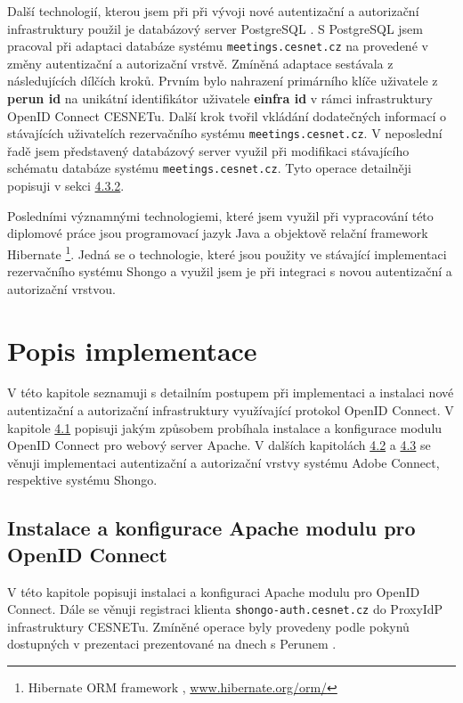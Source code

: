 \documentclass[
  printed, %
  twoside, %
  table,   %
  nolof,     %
  nolot,     %
]{fithesis3}
\begin{document}
\par

Další technologií, kterou jsem při při vývoji nové autentizační a autorizační infrastruktury použil je databázový server PostgreSQL \cite{postgresql}. S PostgreSQL jsem pracoval při adaptaci databáze systému \texttt{meetings.cesnet.cz} na provedené v změny autentizační a autorizační vrstvě. Zmíněná adaptace sestávala z následujících dílčích kroků. Prvním bylo nahrazení primárního klíče uživatele z \textbf{perun id} na unikátní identifikátor uživatele  \textbf{einfra id} v rámci infrastruktury OpenID Connect CESNETu. Další krok tvořil vkládání dodatečných informací o stávajících uživatelích rezervačního systému \texttt{meetings.cesnet.cz}. V neposlední řadě jsem představený databázový server využil při modifikaci stávajícího schématu databáze systému \texttt{meetings.cesnet.cz}. Tyto operace detailněji popisuji v sekci \hyperref[ShongoImpl-web]{4.3.2}. 
\par 
Posledními významnými technologiemi, které jsem využil při vypracování této diplomové práce jsou programovací jazyk Java a objektově relační framework Hibernate \footnote{Hibernate ORM framework , \url{www.hibernate.org/orm/}}. Jedná se o technologie, které jsou použity ve stávající implementaci rezervačního systému Shongo a využil jsem je při integraci s novou autentizační a autorizační vrstvou.  


\chapter{Popis implementace}
V této kapitole seznamuji s detailním postupem při implementaci a instalaci nové autentizační a autorizační infrastruktury využívající protokol OpenID Connect. V kapitole \hyperref[apacheConfig]{4.1} popisuji jakým způsobem probíhala instalace a konfigurace modulu OpenID Connect pro webový server Apache. V dalších kapitolách \hyperref[ACImpl]{4.2} a \hyperref[ShongoImpl]{4.3} se věnuji implementaci autentizační a autorizační vrstvy systému Adobe Connect, respektive systému Shongo.   


\section{Instalace a konfigurace Apache modulu pro OpenID Connect}
\label{apacheInstall}
V této kapitole popisuji instalaci a konfiguraci Apache modulu pro OpenID Connect. Dále se věnuji registraci klienta \texttt{shongo-auth.cesnet.cz} do ProxyIdP infrastruktury CESNETu. Zmíněné operace byly provedeny podle pokynů dostupných v prezentaci prezentované na dnech s Perunem \cite{oidcConfigPresentation}.
\end{document}
